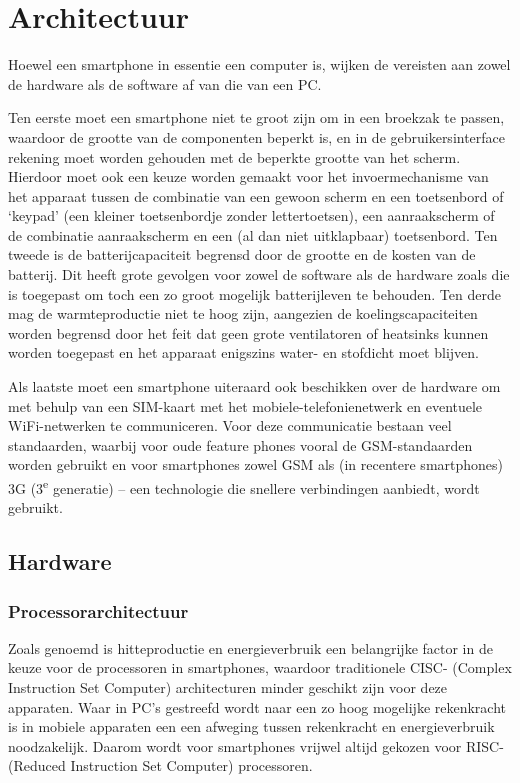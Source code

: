 \chapter{Architectuur}

Hoewel een smartphone in essentie een computer is, wijken de vereisten aan zowel de hardware als de software af van die van een PC.

Ten eerste moet een smartphone niet te groot zijn om in een broekzak te passen, waardoor de grootte van de componenten beperkt is, en in de gebruikersinterface rekening moet worden gehouden met de beperkte grootte van het scherm.
Hierdoor moet ook een keuze worden gemaakt voor het invoermechanisme van het apparaat tussen de combinatie van een gewoon scherm en een toetsenbord of `keypad' (een kleiner toetsenbordje zonder lettertoetsen), een aanraakscherm of de combinatie aanraakscherm en een (al dan niet uitklapbaar) toetsenbord.
Ten tweede is de batterijcapaciteit begrensd door de grootte en de kosten van de batterij.
Dit heeft grote gevolgen voor zowel de software als de hardware zoals die is toegepast om toch een zo groot mogelijk batterijleven te behouden.
Ten derde mag de warmteproductie niet te hoog zijn, aangezien de koelingscapaciteiten worden begrensd door het feit dat geen grote ventilatoren of heatsinks kunnen worden toegepast en het apparaat enigszins water- en stofdicht moet blijven.

Als laatste moet een smartphone uiteraard ook beschikken over de hardware om met behulp van een SIM-kaart met het mobiele-telefonienetwerk en eventuele WiFi-netwerken te communiceren. Voor deze communicatie bestaan veel standaarden, waarbij voor oude feature phones vooral de GSM-standaarden worden gebruikt en voor smartphones zowel GSM als (in recentere smartphones) 3G (3\textsuperscript{e} generatie) -- een technologie die snellere verbindingen aanbiedt, wordt gebruikt.


\section{Hardware}

\subsection{Processorarchitectuur}

Zoals genoemd is hitteproductie en energieverbruik een belangrijke factor in de keuze voor de processoren in smartphones, waardoor traditionele CISC- (Complex Instruction Set Computer) architecturen minder geschikt zijn voor deze apparaten.
Waar in PC's gestreefd wordt naar een zo hoog mogelijke rekenkracht is in mobiele apparaten een een afweging tussen rekenkracht en energieverbruik noodzakelijk.
Daarom wordt voor smartphones vrijwel altijd gekozen voor RISC- (Reduced Instruction Set Computer) processoren.


